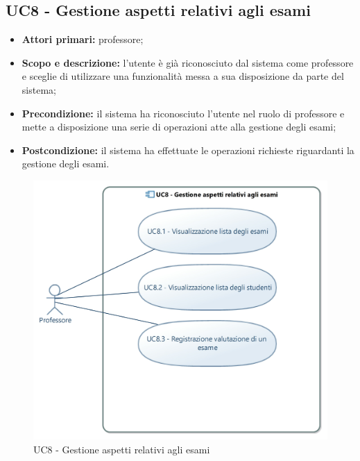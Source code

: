 \documentclass[AnalisiDeiRequisiti.tex]{subfiles}
\begin{document}
\subsection{UC8 - Gestione aspetti relativi agli esami}
\begin{itemize}
	\item \textbf{Attori primari:} professore;
	\item \textbf{Scopo e descrizione:} l'utente è già riconosciuto dal sistema come professore e sceglie di utilizzare una funzionalità messa a sua disposizione da parte del sistema;
	\item \textbf{Precondizione:} il sistema ha riconosciuto l'utente nel ruolo di professore e mette a disposizione una serie di operazioni atte alla gestione degli esami; 
	\item \textbf{Postcondizione:} il sistema ha effettuate le operazioni richieste riguardanti la gestione degli esami.
\end{itemize}
\begin{figure}[H]
	\centering
	\includegraphics[width=0.8\linewidth]{UC8.jpg}
	\caption{UC8 - Gestione aspetti relativi agli esami}
	\label{fig:UC8 - Gestione aspetti relativi agli esami}
\end{figure}
\end{document}
